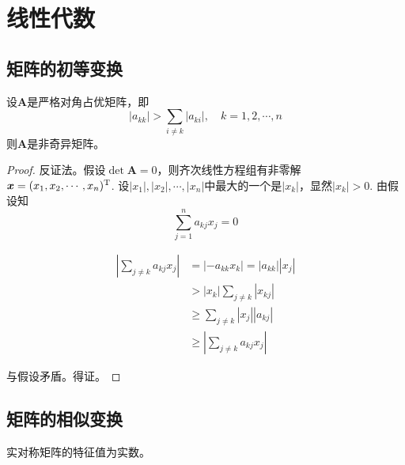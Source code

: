\chapter{线性代数}

\section{矩阵的初等变换}

\begin{theorem}

    设$\boldsymbol{A}$是严格对角占优矩阵，即
    $$|a_{kk}| > \sum\limits_{i \neq k}{|a_{ki}|}, \quad k = 1, 2, \cdots , n$$
    则$\boldsymbol{A}$是非奇异矩阵。

\end{theorem}

\begin{proof}
    
    反证法。假设$\det \boldsymbol{A} = 0$，则齐次线性方程组有非零解$\boldsymbol{x} = (x_1, x_2, \cdots , x_n)^{\mathrm{T}}$.
    设$|x_1|, |x_2|, \cdots , |x_n|$中最大的一个是$|x_k|$，显然$|x_k| > 0$. 由假设知
    $$\sum\limits_{j = 1}^{n}{a_{kj}x_j}  = 0$$
    
    \begin{align*}
        \left| \sum\limits_{j \neq k}{a_{kj}x_j} \right| & = |-a_{kk}x_k| = |a_{kk}||x_j| \\ 
        & > |x_k| \sum\limits_{j \neq k}{|x_{kj}|} \\
        & \geq \sum\limits_{j \neq k}{|x_j||a_{kj}|} \\
        & \geq \left| \sum\limits_{j \neq k}{a_{kj}x_j} \right|
    \end{align*}

    与假设矛盾。得证。
    
\end{proof}

\section{矩阵的相似变换}

\begin{theorem}
    
    实对称矩阵的特征值为实数。

\end{theorem}

